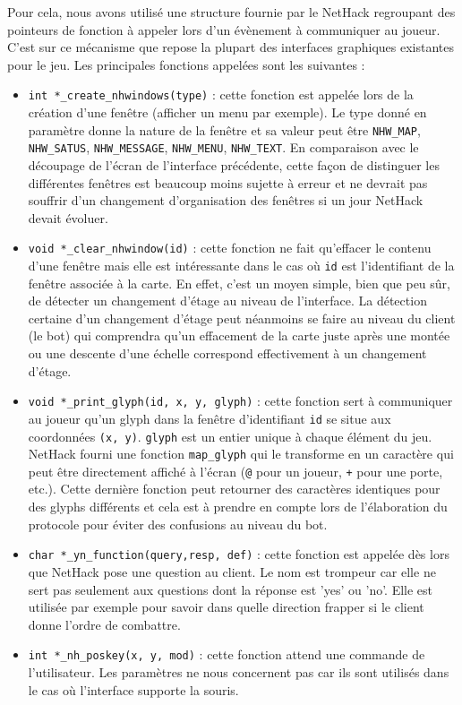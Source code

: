 \documentclass[a4paper,12pt]{article}
\begin{document}
Pour cela, nous avons utilisé une structure fournie par le NetHack regroupant
des pointeurs de fonction à appeler lors d'un évènement à communiquer au
joueur. C'est sur ce mécanisme que repose la plupart des interfaces graphiques
existantes pour le jeu. Les principales fonctions appelées sont les suivantes
:
\begin{itemize}
	\item \verb!int *_create_nhwindows(type)! : cette fonction est appelée
		lors de la création d'une fenêtre (afficher un menu par exemple). Le
		type donné en paramètre donne la nature de la fenêtre et sa valeur
		peut être \verb!NHW_MAP!, \verb!NHW_SATUS!, \verb!NHW_MESSAGE!,
		\verb!NHW_MENU!, \verb!NHW_TEXT!. En comparaison avec le découpage de
		l'écran de l'interface précédente, cette façon de distinguer les
		différentes fenêtres est beaucoup moins sujette à erreur et ne devrait
		pas souffrir d'un changement d'organisation des fenêtres si un jour
		NetHack devait évoluer.
	\item \verb!void *_clear_nhwindow(id)! : cette fonction ne fait qu'effacer
		le contenu d'une fenêtre mais elle est intéressante dans le cas où
		\verb!id! est l'identifiant de la fenêtre associée à la carte. En
		effet, c'est un moyen simple, bien que peu sûr, de détecter un
		changement d'étage au niveau de l'interface. La détection certaine
		d'un changement d'étage peut néanmoins se faire au niveau du client
		(le bot) qui comprendra qu'un effacement de la carte juste après une
		montée ou une descente d'une échelle correspond effectivement à un
		changement d'étage.
	\item \verb!void *_print_glyph(id, x, y, glyph)! : cette fonction sert à
		communiquer au joueur qu'un glyph dans la fenêtre d'identifiant
		\verb!id! se situe aux coordonnées \verb!(x, y)!. \verb!glyph! est un
		entier unique à chaque élément du jeu. NetHack fourni une fonction
		\verb!map_glyph! qui le transforme en un caractère qui peut être
		directement affiché à l'écran (\verb!@! pour un joueur, \verb!+! pour
		une porte, etc.). Cette dernière fonction peut retourner des
		caractères identiques pour des glyphs différents et cela est à prendre
		en compte lors de l'élaboration du protocole pour éviter des
		confusions au niveau du bot.
	\item \verb!char *_yn_function(query,resp, def)! : cette fonction est
		appelée dès lors que NetHack pose une question au client. Le nom est
		trompeur car elle ne sert pas seulement aux questions dont la réponse
		est 'yes' ou 'no'. Elle est utilisée par exemple pour savoir dans
		quelle direction frapper si le client donne l'ordre de combattre.
	\item \verb!int *_nh_poskey(x, y, mod)! : cette fonction attend une
		commande de l'utilisateur. Les paramètres ne nous concernent pas car
		ils sont utilisés dans le cas où l'interface supporte la souris.
\end{itemize}
\end{document}
